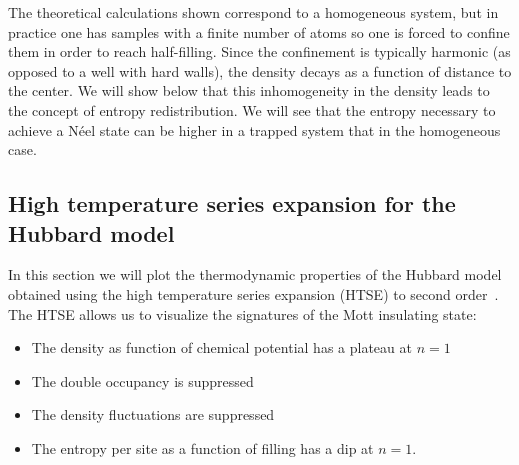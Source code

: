 \documentclass[11pt,letter]{article}
\begin{document}
The theoretical calculations shown correspond to a homogeneous system, but in
practice  one has samples with a finite number of atoms so one is forced to
confine them in order to reach half-filling.   Since the confinement is
typically harmonic (as opposed to a well with hard walls), the density decays
as a function of distance to the center.   We will show below that this
inhomogeneity in the density leads to the concept of entropy redistribution.
We will see that the entropy necessary to achieve a N\'{e}el state can be
higher in a trapped system that in the homogeneous case. 


\subsection{High temperature series expansion for the Hubbard model}

In this section we will plot the thermodynamic properties of the Hubbard model
obtained using the high temperature series expansion (HTSE) to second
order~\cite{Henderson1992,Jordens2010}.   The  HTSE allows us to visualize the
signatures of the Mott insulating state:
\begin{itemize}
   \item The density as function of chemical potential has a plateau at $n=1$
   \item The double occupancy is suppressed 
   \item The density fluctuations are suppressed 
   \item The entropy per site as a function of filling has a dip at $n=1$. 
\end{itemize} 
\end{document}
